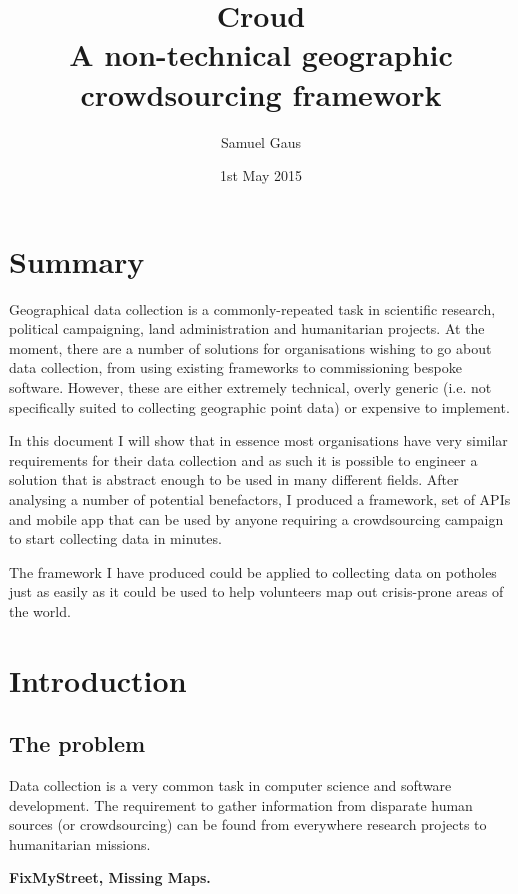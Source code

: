 \documentclass{article}
\let\oldsection\section
\renewcommand\section{\clearpage\oldsection}
\begin{document}
	\title{Croud \\ \vspace{2 mm} {\large A non-technical geographic crowdsourcing framework}}
	\author{Samuel Gaus}
	\date{1st May 2015}
	\maketitle

	\tableofcontents

	\section{Summary}
		Geographical data collection is a commonly-repeated task in scientific research, political campaigning, land administration and humanitarian projects.
		At the moment, there are a number of solutions for organisations wishing to go about data collection, from using existing frameworks to commissioning bespoke software.
		However, these are either extremely technical, overly generic (i.e. not specifically suited to collecting geographic point data) or expensive to implement.

		In this document I will show that in essence most organisations have very similar requirements for their data collection and as such it is possible to engineer a solution that is abstract enough to be used in many different fields.
		After analysing a number of potential benefactors, I produced a framework, set of APIs and mobile app that can be used by anyone requiring a crowdsourcing campaign to start collecting data in minutes.

		The framework I have produced could be applied to collecting data on potholes just as easily as it could be used to help volunteers map out crisis-prone areas of the world.

	\section{Introduction}
		\subsection{The problem}
		Data collection is a very common task in computer science and software development. The requirement to gather information from disparate human sources (or crowdsourcing) can be found from everywhere research projects to humanitarian missions.

		\textbf{FixMyStreet, Missing Maps.}
\end{document}
